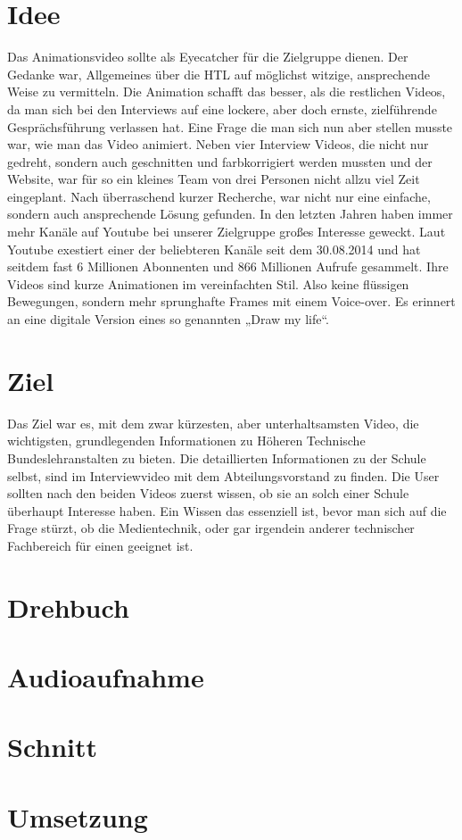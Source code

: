 \section{Idee}
\renewcommand{\kapitelautor}{Autor: Niklas Kienreich}
Das Animationsvideo sollte als Eyecatcher für die Zielgruppe dienen. Der Gedanke war, Allgemeines über die HTL auf möglichst witzige, ansprechende Weise zu vermitteln. Die Animation schafft das besser, als die restlichen Videos, da man sich bei den Interviews auf eine lockere, aber doch ernste, zielführende Gesprächsführung verlassen hat. Eine Frage die man sich nun aber stellen musste war, wie man das Video animiert. Neben vier Interview Videos, die nicht nur gedreht, sondern auch geschnitten und farbkorrigiert werden mussten und der Website, war für so ein kleines Team von drei Personen nicht allzu viel Zeit eingeplant. Nach überraschend kurzer Recherche, war nicht nur eine einfache, sondern auch ansprechende Lösung gefunden. In den letzten Jahren haben immer mehr Kanäle auf Youtube bei unserer Zielgruppe großes Interesse geweckt. Laut Youtube exestiert einer der beliebteren Kanäle seit dem 30.08.2014 und hat seitdem fast 6 Millionen Abonnenten und 866 Millionen Aufrufe gesammelt. Ihre Videos sind kurze Animationen im vereinfachten Stil. Also keine flüssigen Bewegungen, sondern mehr sprunghafte Frames mit einem Voice-over. Es erinnert an eine digitale Version eines so genannten „Draw my life“.
\section{Ziel}
\renewcommand{\kapitelautor}{Autor: Niklas Kienreich}
Das Ziel war es, mit dem zwar kürzesten, aber unterhaltsamsten Video, die wichtigsten, grundlegenden Informationen zu Höheren Technische Bundeslehranstalten zu bieten. Die detaillierten Informationen zu der Schule selbst, sind im Interviewvideo mit dem Abteilungsvorstand zu finden. Die User sollten nach den beiden Videos zuerst wissen, ob sie an solch einer Schule überhaupt Interesse haben. Ein Wissen das essenziell ist, bevor man sich auf die Frage stürzt, ob die Medientechnik, oder gar irgendein anderer technischer Fachbereich für einen geeignet ist.
\section{Drehbuch}
\renewcommand{\kapitelautor}{Autor: Niklas Kienreich}
\section{Audioaufnahme}
\renewcommand{\kapitelautor}{Autor: Niklas Kienreich}
\section{Schnitt}
\renewcommand{\kapitelautor}{Autor: Niklas Kienreich}
\section{Umsetzung}
\renewcommand{\kapitelautor}{Autor: Niklas Kienreich}